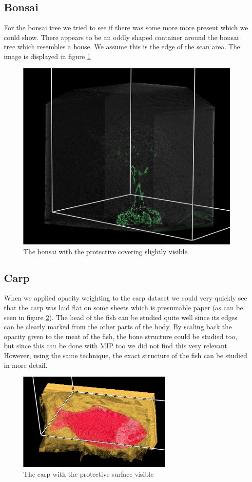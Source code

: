 \documentclass[a4paper,twoside,11pt]{article}
\begin{document}
 \subsection{Bonsai}
 For the bonsai tree we tried to see if there was some more more present which we could show. There appears to be an oddly shaped container around the bonsai tree which resembles a house. We assume this is the edge of the scan area. The image is displayed in figure \ref{bonsaiOp}
  \begin{figure}[h]
 \centering
 \includegraphics[scale=0.6]{images/bonsaiOp}
 \caption{The bonsai with the protective covering slightly visible}
 \label{bonsaiOp}
 \end{figure}
 
 \subsection{Carp}
 When we applied opacity weighting to the carp dataset we could very quickly see that the carp was laid flat on some sheets which is presumable paper (as can be seen in figure \ref{carpOp}). The head of the fish can be studied quite well since its edges can be clearly marked from the other parts of the body. By scaling back the opacity given to the meat of the fish, the bone structure could be studied too, but since this can be done with MIP too we did not find this very relevant. However, using the same technique, the exact structure of the fish can be studied in more detail.
 \begin{figure}[h]
 \centering
 \includegraphics{images/carpOp}
 \caption{The carp with the protective surface visible}
 \label{carpOp}
 \end{figure}
 
\end{document}
